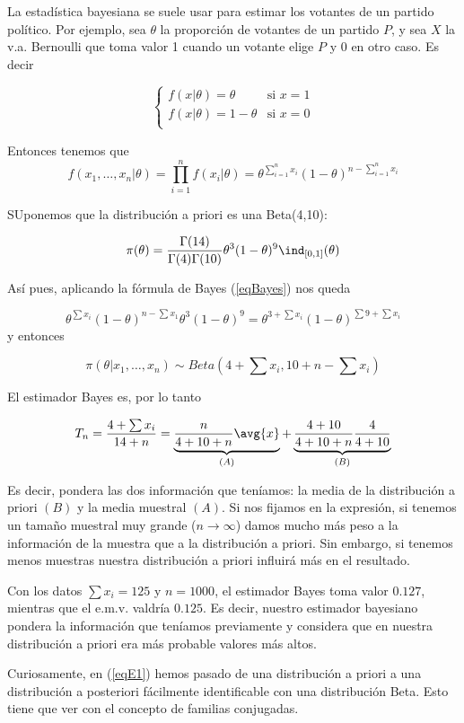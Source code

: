 \documentclass{apuntes}
\begin{document}
La estadística bayesiana se suele usar para estimar los votantes de un partido político. Por ejemplo, sea $\theta$ la proporción de votantes de un partido $P$, y sea $X$ la v.a. Bernoulli que toma valor 1 cuando un votante elige $P$ y 0 en otro caso. Es decir

\[ \begin{cases}
f(x|\theta) = \theta &\text{si } x=1 \\
f(x|\theta) = 1 - \theta &\text{si } x=0 \\
\end{cases} \]

Entonces tenemos que \[ f(x_1,\dotsc,x_n|\theta) = \prod_{i=1}^n f(x_i|\theta) = \theta^{\sum_{i=1}^n x_i} (1-\theta)^{n -\sum_{i=1}^n x_i} \]

SUponemos que la distribución a priori es una Beta(4,10):

\[ \pi(\theta) = \frac{\Gamma(14)}{\Gamma(4)\Gamma(10)}\theta^3(1-\theta)^9\ind_{[0,1]}(\theta) \]

Así pues, aplicando la fórmula de Bayes (\ref{eqBayes}) nos queda 

\begin{equation}\label{eqE1}
\theta^{\sum x_i}(1-\theta)^{n-\sum x_1} \theta^3 (1-\theta)^9 = \theta^{3+\sum x_i} (1-\theta)^{\sum 9 + \sum x_i} 
\end{equation} y entonces

\[  \pi(\theta | x_1,\dotsc,x_n)  \sim Beta(4 + \sum x_i, 10 + n - \sum x_i) \]

El estimador Bayes es, por lo tanto

\[ T_n = \frac{4 + \sum x_i}{14 + n} = \underbrace{\frac{n}{4 + 10 + n}\avg{x}}_{(A)} + \underbrace{\frac{4+10}{4+10+n}\frac{4}{4+10}}_{(B)} \]

Es decir, pondera las dos información que teníamos: la media de la distribución a priori $(B)$ y la media muestral $(A)$. Si nos fijamos en la expresión, si tenemos un tamaño muestral muy grande ($n\to\infty$) damos mucho más peso a la información de la muestra que a la distribución a priori. Sin embargo, si tenemos menos muestras nuestra distribución a priori influirá más en el resultado.

Con los datos $\sum x_i = 125$ y $n = 1000$, el estimador Bayes toma valor $0.127$, mientras que el e.m.v. valdría $0.125$. Es decir, nuestro estimador bayesiano pondera la información que teníamos previamente y considera que en nuestra distribución a priori era más probable valores más altos.

Curiosamente, en (\ref{eqE1}) hemos pasado de una distribución a priori a una distribución a posteriori fácilmente identificable con una distribución Beta. Esto tiene que ver con el concepto de familias conjugadas.
\end{document}
